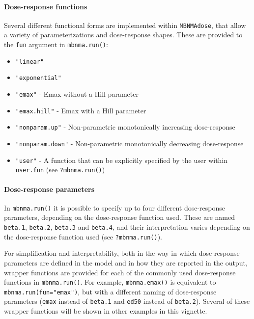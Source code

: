 \documentclass[]{article}
\providecommand{\tightlist}{%
  \setlength{\itemsep}{0pt}\setlength{\parskip}{0pt}}
\let\oldparagraph\paragraph
\renewcommand{\paragraph}[1]{\oldparagraph{#1}\mbox{}}
\begin{document}
\hypertarget{dose-response-functions}{%
\paragraph{Dose-response functions}\label{dose-response-functions}}

Several different functional forms are implemented within
\texttt{MBNMAdose}, that allow a variety of parameterizations and
dose-response shapes. These are provided to the \texttt{fun} argument in
\texttt{mbnma.run()}:

\begin{itemize}
\tightlist
\item
  \texttt{"linear"}
\item
  \texttt{"exponential"}
\item
  \texttt{"emax"} - Emax without a Hill parameter
\item
  \texttt{"emax.hill"} - Emax with a Hill parameter
\item
  \texttt{"nonparam.up"} - Non-parametric monotonically increasing
  dose-response
\item
  \texttt{"nonparam.down"} - Non-parametric monotonically decreasing
  dose-response
\item
  \texttt{"user"} - A function that can be explicitly specified by the
  user within \texttt{user.fun} (see \texttt{?mbnma.run()})
\end{itemize}

\hypertarget{dose-response-parameters}{%
\paragraph{Dose-response parameters}\label{dose-response-parameters}}

In \texttt{mbnma.run()} it is possible to specify up to four different
dose-response parameters, depending on the dose-response function used.
These are named \texttt{beta.1}, \texttt{beta.2}, \texttt{beta.3} and
\texttt{beta.4}, and their interpretation varies depending on the
dose-response function used (see \texttt{?mbnma.run()}).

For simplification and interpretability, both in the way in which
dose-response parameters are defined in the model and in how they are
reported in the output, wrapper functions are provided for each of the
commonly used dose-response functions in \texttt{mbnma.run()}. For
example, \texttt{mbnma.emax()} is equivalent to
\texttt{mbnma.run(fun="emax")}, but with a different naming of
dose-response parameters (\texttt{emax} instead of \texttt{beta.1} and
\texttt{ed50} instead of \texttt{beta.2}). Several of these wrapper
functions will be shown in other examples in this vignette.
\end{document}
